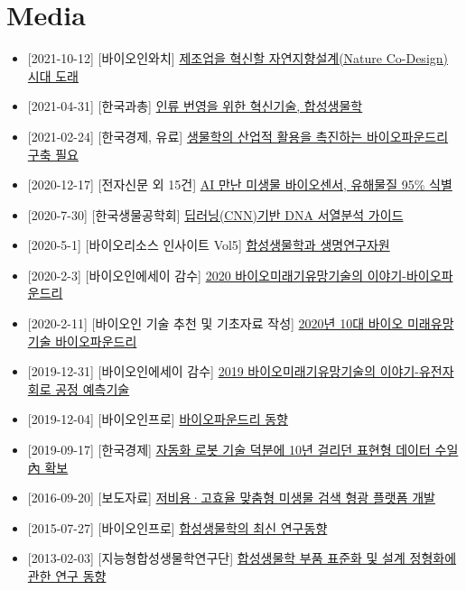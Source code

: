 \documentclass[
]{book}
\providecommand{\tightlist}{%
  \setlength{\itemsep}{0pt}\setlength{\parskip}{0pt}}
\begin{document}
\hypertarget{media}{%
\chapter{Media}\label{media}}

\begin{itemize}
\tightlist
\item
  {[}2021-10-12{]} {[}바이오인와치{]}
  \href{https://www.bioin.or.kr/board.do?num=311389\&cmd=view\&bid=issue}{제조업을
  혁신할 자연지향설계(Nature Co-Design) 시대 도래}
\item
  {[}2021-04-31{]} {[}한국과총{]}
  \href{http://ebook.kofst.or.kr/book/202104/\#page=71}{인류 번영을 위한
  혁신기술, 합성생물학}
\item
  {[}2021-02-24{]} {[}한국경제, 유료{]}
  \href{https://www.hankyung.com/it/article/202102096254i}{생물학의
  산업적 활용을 촉진하는 바이오파운드리 구축 필요}
\item
  {[}2020-12-17{]} {[}전자신문 외 15건{]}
  \href{https://www.fnnews.com/news/202012161243526206}{AI 만난 미생물
  바이오센서, 유해물질 95\% 식별}
\item
  {[}2020-7-30{]} {[}한국생물공학회{]}
  \href{http://www.btnews.or.kr/bbs/board.php?bo_table=bt_news\&wr_id=342}{딥러닝(CNN)기반
  DNA 서열분석 가이드}
\item
  {[}2020-5-1{]} {[}바이오리소스 인사이트 Vol5{]}
  \href{https://www.kobis.re.kr/go_document?page_name=publication_bio_insight}{합성생물학과
  생명연구자원}
\item
  {[}2020-2-3{]} {[}바이오인에세이 감수{]}
  \href{https://www.bioin.or.kr/board.do?num=304334\&cmd=view\&bid=essay}{2020
  바이오미래기유망기술의 이야기-바이오파운드리}
\item
  {[}2020-2-11{]} {[}바이오인 기술 추천 및 기초자료 작성{]}
  \href{https://www.bioin.or.kr/board.do?num=293995\&cmd=view\&bid=essay\&cPage=1\&cate1=all\&cate2=all2}{2020년
  10대 바이오 미래유망기술 바이오파운드리}
\item
  {[}2019-12-31{]} {[}바이오인에세이 감수{]}
  \href{https://www.bioin.or.kr/board.do?num=292912\&cmd=view\&bid=essay}{2019
  바이오미래기유망기술의 이야기-유전자회로 공정 예측기술}
\item
  {[}2019-12-04{]} {[}바이오인프로{]}
  \href{https://www.bioin.or.kr/board.do?num=292266\&cmd=view\&bid=report\&cPage=1\&cate1=all\&cate2=all2}{바이오파운드리
  동향}
\item
  {[}2019-09-17{]} {[}한국경제{]}
  \href{https://www.hankyung.com/it/article/2019091732761}{자동화 로봇
  기술 덕분에 10년 걸리던 표현형 데이터 수일 內 확보}
\item
  {[}2016-09-20{]} {[}보도자료{]}
  \href{https://www.bioin.or.kr/board.do?num=263870\&cmd=view\&bid=research}{저비용·고효율
  맞춤형 미생물 검색 형광 플랫폼 개발}
\item
  {[}2015-07-27{]} {[}바이오인프로{]}
  \href{https://www.bioin.or.kr/board.do?num=253760\&cmd=view\&bid=report}{합성생물학의
  최신 연구동향}
\item
  {[}2013-02-03{]} {[}지능형합성생물학연구단{]}
  \href{http://www.syntheticbiology.or.kr/board.php?db=sub0302\&no=44\&c=view\&page=8}{합성생물학
  부품 표준화 및 설계 정형화에 관한 연구 동향}
\end{itemize}
\end{document}
